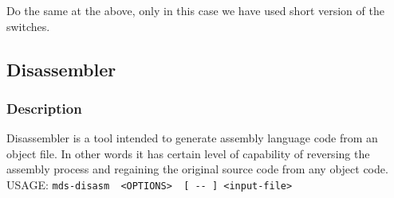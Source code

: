             Do the same at the above, only in this case we have used short version of the switches.\\

    \subsection{Disassembler}
        \subsubsection{Description}
            Disassembler is a tool intended to generate assembly language code from an object file. In other words it has certain level of
            capability of reversing the assembly process and regaining the original source code from any object code.\\

            USAGE:
            {
                \usecodefont
                \verb'mds-disasm  <OPTIONS>  [ -- ] <input-file>'\\
            }

